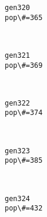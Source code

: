 \documentclass[11pt]{article}
\begin{document}
    \begin{Verbatim}[commandchars=\\\{\}]
gen320
pop\#=365

    \end{Verbatim}

    \begin{center}
    \end{center}
    { \hspace*{\fill} \\}
    
    \begin{Verbatim}[commandchars=\\\{\}]
gen321
pop\#=369

    \end{Verbatim}

    \begin{center}
    \end{center}
    { \hspace*{\fill} \\}
    
    \begin{Verbatim}[commandchars=\\\{\}]
gen322
pop\#=374

    \end{Verbatim}

    \begin{center}
    \end{center}
    { \hspace*{\fill} \\}
    
    \begin{Verbatim}[commandchars=\\\{\}]
gen323
pop\#=385

    \end{Verbatim}

    \begin{center}
    \end{center}
    { \hspace*{\fill} \\}
    
    \begin{Verbatim}[commandchars=\\\{\}]
gen324
pop\#=432

    \end{Verbatim}
\end{document}
